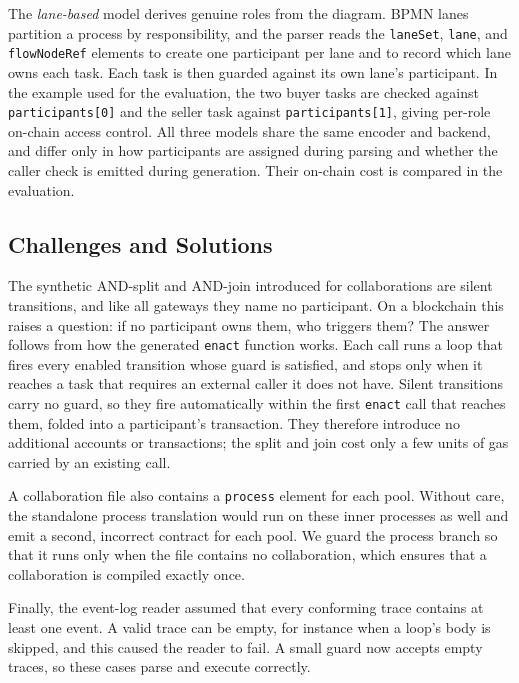 \documentclass[runningheads]{llncs}
\begin{document}
The \emph{lane-based} model derives genuine roles from the diagram. BPMN lanes partition a process by responsibility, and the parser reads the \texttt{laneSet}, \texttt{lane}, and \texttt{flowNodeRef} elements to create one participant per lane and to record which lane owns each task. Each task is then guarded against its own lane's participant. In the example used for the evaluation, the two buyer tasks are checked against \texttt{participants[0]} and the seller task against \texttt{participants[1]}, giving per-role on-chain access control. All three models share the same encoder and backend, and differ only in how participants are assigned during parsing and whether the caller check is emitted during generation. Their on-chain cost is compared in the evaluation.

\subsection{Challenges and Solutions}
The synthetic AND-split and AND-join introduced for collaborations are silent transitions, and like all gateways they name no participant. On a blockchain this raises a question: if no participant owns them, who triggers them? The answer follows from how the generated \texttt{enact} function works. Each call runs a loop that fires every enabled transition whose guard is satisfied, and stops only when it reaches a task that requires an external caller it does not have. Silent transitions carry no guard, so they fire automatically within the first \texttt{enact} call that reaches them, folded into a participant's transaction. They therefore introduce no additional accounts or transactions; the split and join cost only a few units of gas carried by an existing call.

A collaboration file also contains a \texttt{process} element for each pool. Without care, the standalone process translation would run on these inner processes as well and emit a second, incorrect contract for each pool. We guard the process branch so that it runs only when the file contains no collaboration, which ensures that a collaboration is compiled exactly once.

Finally, the event-log reader assumed that every conforming trace contains at least one event. A valid trace can be empty, for instance when a loop's body is skipped, and this caused the reader to fail. A small guard now accepts empty traces, so these cases parse and execute correctly.

\end{document}
